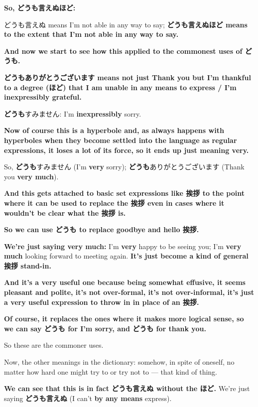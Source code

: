 {\bf So, どうも言えぬほど:}

どうも言えぬ means I'm not able in any way to say; {\bf どうも言えぬほど means to the extent that I'm not able in any way to say.}

\thinrule

{\bf And now we start to see how this applied to the commonest uses of どうも.}

{\bf どうもありがとうございます means not just Thank you but I'm thankful to a degree (ほど) that I am unable in any means to express / I'm inexpressibly grateful.}

{\bf どうも}すみません: I'm {\bf inexpressibly} sorry.

{\bf Now of course this is a hyperbole and, as always happens with hyperboles when they become settled into the language as regular expressions, it loses a lot of its force, so it ends up just meaning very.}

So, {\bf どうも}すみません (I'm {\bf very} sorry); {\bf どうも}ありがとうございます (Thank you {\bf very much}).

\thinrule

{\bf And this gets attached to basic set expressions like 挨拶 to the point where it can be used to replace the 挨拶 even in cases where it wouldn't be clear what the 挨拶 is.}

{\bf So we can use どうも to replace goodbye and hello 挨拶.}

{\bf We're just saying very much:} I'm {\bf very} happy to be seeing you; I'm {\bf very much} looking forward to meeting again. {\bf It's just become a kind of general 挨拶 stand-in.}

\thinrule

{\bf And it's a very useful one because being somewhat effusive, it seems pleasant and polite, it's not over-formal, it's not over-informal, it's just a very useful expression to throw in in place of an 挨拶.}

{\bf Of course, it replaces the ones where it makes more logical sense, so we can say どうも for I'm sorry, and どうも for thank you.}

So these are the commoner uses.

\thinrule

Now, the other meanings in the dictionary: somehow, in spite of oneself, no matter how hard one might try to or try not to --- that kind of thing.

{\bf We can see that this is in fact どうも言えぬ without the ほど.} We're just saying {\bf どうも言えぬ} (I can't {\bf by any means} express).

